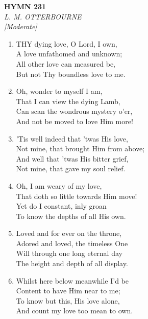 \documentclass[11pt,a4paper]{article}
\begin{document}
\newpage
\begin{center}
    {\Large \textbf{HYMN 231}}
    \\
    \textit{L. M. OTTERBOURNE}
    \\
    \textit{\small [Moderate]}
\end{center}
\vspace{1em}

\begin{enumerate}
    \item THY dying love, O Lord, I own, \\
        A love unfathomed and unknown; \\
        All other love can measured be, \\
        But not Thy boundless love to me.

    \item Oh, wonder to myself I am, \\
        That I can view the dying Lamb, \\
        Can scan the wondrous mystery o'er, \\
        And not be moved to love Him more!

    \item 'Tis well indeed that 'twas His love, \\
        Not mine, that brought Him from above; \\
        And well that 'twas His bitter grief, \\
        Not mine, that gave my soul relief.

    \item Oh, I am weary of my love, \\
        That doth so little towards Him move! \\
        Yet do I constant, inly groan \\
        To know the depths of all His own.

    \item Loved and for ever on the throne, \\
        Adored and loved, the timeless One \\
        Will through one long eternal day \\
        The height and depth of all display.

    \item Whilst here below meanwhile I'd be \\
        Content to have Him near to me; \\
        To know but this, His love alone, \\
        And count my love too mean to own.

\end{enumerate}
\end{document}
